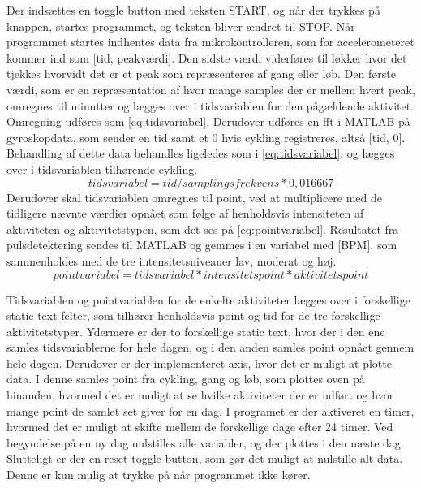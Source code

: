Der indsættes en toggle button med teksten START, og når der trykkes på knappen, startes programmet, og teksten bliver ændret til STOP. Når programmet startes indhentes data fra mikrokontrolleren, som for accelerometeret kommer ind som [tid, peakværdi]. Den sidste værdi viderføres til løkker hvor det tjekkes hvorvidt det er et peak som repræsenteres af gang eller løb. Den første værdi, som er en repræsentation af hvor mange samples der er mellem hvert peak, omregnes til minutter og lægges over i tidsvariablen for den pågældende aktivitet. Omregning udføres som \eqref{eq:tidsvariabel}. Derudover udføres en fft i MATLAB på gyroskopdata, som sender en tid samt et 0 hvis cykling registreres, altså [tid, 0]. Behandling af dette data behandles ligeledes som i \eqref{eq:tidsvariabel}, og lægges over i tidsvariablen tilhørende cykling.
\begin{equation}
\label{eq:tidsvariabel}
	tidsvariabel = tid/samplingsfrekvens*0,016667
\end{equation}
Derudover skal tidsvariablen omregnes til point, ved at multiplicere med de tidligere nævnte værdier opnået som følge af henholdsvis intensiteten af aktiviteten og aktivitetstypen, som det ses på \eqref{eq:pointvariabel}. Resultatet fra pulsdetektering sendes til MATLAB og gemmes i en variabel med [BPM], som sammenholdes med de tre intensitetsniveauer lav, moderat og høj. 
\begin{equation}
\label{eq:pointvariabel}
pointvariabel = tidsvariabel*intensitetspoint*aktivitetspoint
\end{equation}

Tidsvariablen og pointvariablen for de enkelte aktiviteter lægges over i forskellige static text felter, som tilhører henholdsvis point og tid for de tre forskellige aktivitetstyper. Ydermere er der to forskellige static text, hvor der i den ene samles tidsvariablerne for hele dagen, og i den anden samles point opnået gennem hele dagen. 
Derudover er der implementeret axis, hvor det er muligt at plotte data. I denne samles point fra cykling, gang og løb, som plottes oven på hinanden, hvormed det er muligt at se hvilke aktiviteter der er udført og hvor mange point de samlet set giver for en dag. 
I programet er der aktiveret en timer, hvormed det er muligt at skifte mellem de forskellige dage efter 24 timer. Ved begyndelse på en ny dag nulstilles alle variabler, og der plottes i den næste dag. Slutteligt er der en reset toggle button, som gør det muligt at nulstille alt data. Denne er kun mulig at trykke på når programmet ikke kører. 

